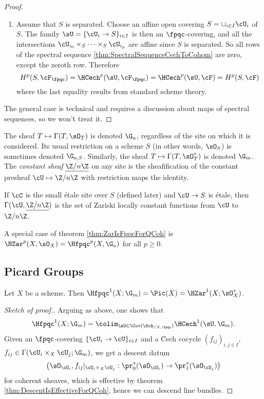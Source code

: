 \begin{proof}
\begin{enumerate}[\it Step 1.]
\begin{description}
\end{description}
\item
Assume that $S$ is separated. Choose an affine open covering $S = \cup_{i \in I} \cU_i$ of $S$. The family $\sU = \{ \cU_i \to S \}_{i \in I}$ is then an $\fpqc$-covering, and all the intersections $\cU_{i_0} \times_S \cdots \times_S \cU_{i_p}$ are affine since $S$ is separated. So all rows of the spectral sequence \ref{thm:SpectralSequenceCechToCohom} are zero, except the zeroth row. Therefore
$$
H^p(S, \cF_\fpqc) = \HCech^p(\sU, \cF_\fpqc) = \HCech^p(\sU, \cF) = H^p(S, \cF)
$$
where the last equality results from standard scheme theory.
\end{enumerate}
The general case is technical and requires a discussion about maps of spectral sequences, so we won't treat it.
\end{proof}

\begin{defi}
The sheaf $T \mapsto \Gamma(T, \sO_T)$ is denoted $\G_a$, regardless of the site on which it is considered. Its usual restriction on a scheme $S$ (in other words, $\sO_S$) is sometimes denoted $\G_{a,S}$. Similarly, the sheaf $T \mapsto \Gamma(T, \sO^*_T)$ is denoted $\G_m$.
The \emph{constant sheaf} $\underline{\Z/n\Z}$ on any site is the sheafification of the constant presheaf $\cU \mapsto \Z/n\Z$ with restriction maps the identity.
\end{defi}

\begin{remark}
If $\cC$ is the small \'etale site over $S$ (defined later) and $\cU \to S$ is \'etale, then $\Gamma(\cU, \underline{\Z/n\Z})$ is the set of Zariski locally constant functions from $\cU$ to $\Z/n\Z$.
\end{remark}

\begin{remark}
A special case of theorem \ref{thm:ZarIsFpqcForQCoh} is $\HZar^p (X, \sO_X) = \Hfpqc^p(X, \G_a)$ for all $p \geqslant 0$.
\end{remark}

\subsection{Picard Groups}

\begin{thm}
Let $X$ be a scheme. Then $\Hfpqc^1(X ; \G_m) = \Pic (X) = \HZar^1(X; \sO_X^*)$.
\end{thm}

\begin{proof}[Sketch of proof.]
Arguing as above, one shows that
$$
\Hfpqc^1(X ; \G_m) = \colim_{\sU \in \Cov(\Sch_{/X,\fpqc})} \HCech^1(\sU, \G_m).
$$
Given an $\fpqc$-covering $\{ \cU_i \to \cU \}_{i \in I}$ and a \u Cech cocycle $(f_{ij})_{i,j \in I}$, $f_{ij} \in \Gamma(\cU_i \times_X \cU_j; \G_m)$, we get a descent datum
$$
\left(\sO_{\cU_i}, f_{ij} |_{\cU_i \times_X \cU_j}: \pr_0^*(\sO_{\cU_i}) \to \pr_1^*(\sO_{\cU_j})\right)
$$
for coherent sheaves, which is effective by theorem \ref{thm:DescentIsEffectiveForQCoh}, hence we can descend line bundles.
\end{proof}

